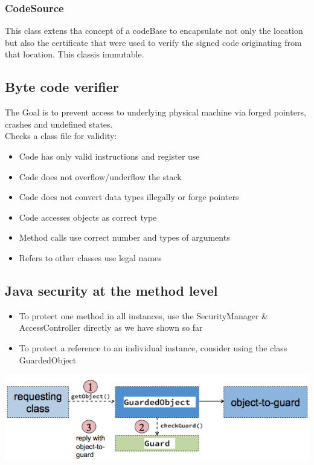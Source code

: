 \documentclass[10pt]{article}
\begin{document}
\subsubsection{CodeSource}
This class extens tha concept of a codeBase to encapsulate not only the location but also the certificate that were used to verify the signed code originating from that location. This classis immutable. 

\subsection{Byte code verifier}
The Goal is to prevent access to underlying physical machine via forged pointers, crashes and undefined states. \\
Checks a class file for validity:
\begin{itemize}
	\item Code has only valid instructions and register use
	\item Code does not overflow/underflow the stack
	\item Code does not convert data types illegally or forge pointers
	\item Code accesses objects as correct type
	\item Method calls use correct number and types of arguments
	\item Refers to other classes use legal names
\end{itemize}

\subsection{Java security at the method level}
\begin{itemize}
	\item To protect one method in all instances, use the SecurityManager \& AccessController directly as we have shown so far
	\item To protect a reference to an individual instance, consider using  the class GuardedObject
\end{itemize}
\begin{center}
	\includegraphics[scale=0.3]{guardedObject.png}
\end{center}
\end{document}
